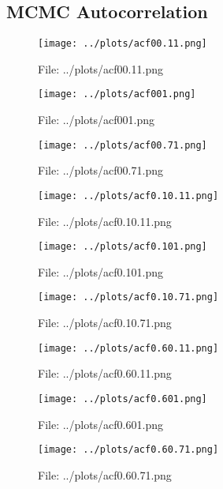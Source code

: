 \documentclass[a4paper, 11pt]{report}
\let\Oldsubsection\subsection
\renewcommand{\subsection}{\FloatBarrier\Oldsubsection}
\begin{document}
\subsection{MCMC Autocorrelation}
\begin{figure}[h!] \caption{File: ../plots/acf00.11.png} \texttt{[image: ../plots/acf00.11.png]} \end{figure}
\begin{figure}[h!] \caption{File: ../plots/acf001.png} \texttt{[image: ../plots/acf001.png]} \end{figure}
\begin{figure}[h!] \caption{File: ../plots/acf00.71.png} \texttt{[image: ../plots/acf00.71.png]} \end{figure}
\begin{figure}[h!] \caption{File: ../plots/acf0.10.11.png} \texttt{[image: ../plots/acf0.10.11.png]} \end{figure}
\begin{figure}[h!] \caption{File: ../plots/acf0.101.png} \texttt{[image: ../plots/acf0.101.png]} \end{figure}
\begin{figure}[h!] \caption{File: ../plots/acf0.10.71.png} \texttt{[image: ../plots/acf0.10.71.png]} \end{figure}
\begin{figure}[h!] \caption{File: ../plots/acf0.60.11.png} \texttt{[image: ../plots/acf0.60.11.png]} \end{figure}
\begin{figure}[h!] \caption{File: ../plots/acf0.601.png} \texttt{[image: ../plots/acf0.601.png]} \end{figure}
\begin{figure}[h!] \caption{File: ../plots/acf0.60.71.png} \texttt{[image: ../plots/acf0.60.71.png]} \end{figure}
\end{document}
